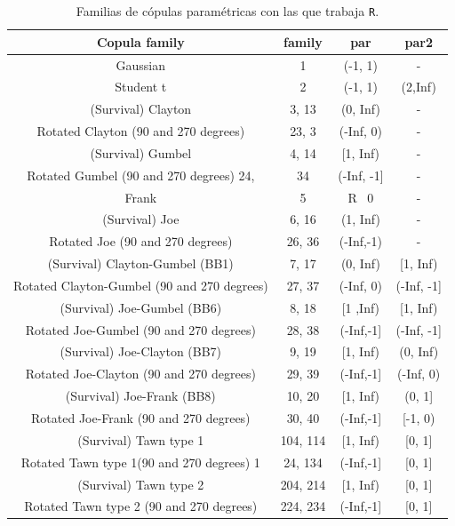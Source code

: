 \begin{table}[H]
    \centering
    \begin{tabular}{||c|c|c|c||}
    \hline\hline
\textbf{Copula family}	       & \textbf{family}    & \textbf{par}	    & \textbf{par2}      \\\hline
Gaussian	                                & 1	        & (-1, 1)	& -         \\
Student t	                                & 2	        & (-1, 1)	& (2,Inf)   \\
(Survival) Clayton	                        & 3, 13	    & (0, Inf)	& -         \\
Rotated Clayton (90 and 270 degrees)	    & 23, 3     & (-Inf, 0)	& -         \\
(Survival) Gumbel	                        & 4, 14	    & [1, Inf)	& -         \\
Rotated Gumbel (90 and 270 degrees)	24,     & 34	    & (-Inf, -1]& -         \\
Frank	                                    & 5	        & R \ {0}	& -         \\
(Survival) Joe	                            & 6, 16	    & (1, Inf)	& -         \\
Rotated Joe (90 and 270 degrees)	        & 26, 36    & (-Inf,-1)	& -         \\
(Survival) Clayton-Gumbel (BB1)	            & 7, 17	    & (0, Inf)	& [1, Inf)  \\
Rotated Clayton-Gumbel (90 and 270 degrees)	& 27, 37	& (-Inf, 0)	& (-Inf, -1]\\
(Survival) Joe-Gumbel (BB6)	                & 8, 18	    & [1 ,Inf)	& [1, Inf)  \\
Rotated Joe-Gumbel (90 and 270 degrees)	    & 28, 38	& (-Inf,-1]	& (-Inf, -1]\\
(Survival) Joe-Clayton (BB7)	            & 9, 19	    & [1, Inf)	& (0, Inf)  \\
Rotated Joe-Clayton (90 and 270 degrees)	& 29, 39	& (-Inf,-1]	& (-Inf, 0) \\
(Survival) Joe-Frank (BB8)	                & 10, 20	& [1, Inf)	& (0, 1]    \\
Rotated Joe-Frank (90 and 270 degrees)	    & 30, 40	& (-Inf,-1] & [-1, 0)   \\
(Survival) Tawn type 1	                    & 104, 114	& [1, Inf)	& [0, 1]    \\
Rotated Tawn type 1(90 and 270 degrees)	1   & 24, 134	& (-Inf,-1]	& [0, 1]    \\
(Survival) Tawn type 2	                    & 204, 214	& [1, Inf)	& [0, 1]    \\ 
Rotated Tawn type 2 (90 and 270 degrees)	& 224, 234	& (-Inf,-1]	& [0, 1]    \\ \hline \hline
    \end{tabular}
    \caption{Familias de cópulas paramétricas con las que trabaja \texttt{R}.}
    \label{tab:family_set}
\end{table}

